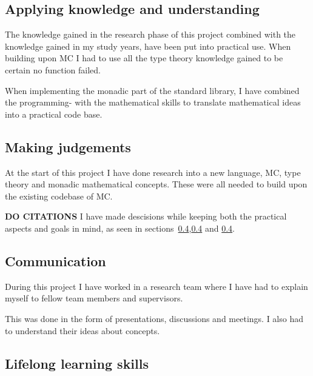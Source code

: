 \subsection{Applying knowledge and understanding}
The knowledge gained in the research phase of this project combined with the knowledge gained in my study years, have been put into practical use.
When building upon MC I had to use all the type theory knowledge gained to be certain no function failed.

When implementing the monadic part of the standard library, I have combined the programming- with the mathematical skills to translate mathematical ideas into a practical code base.


\subsection{Making judgements}
At the start of this project I have done research into a new language, MC, type theory and monadic mathematical concepts.
These were all needed to build upon the existing codebase of MC.

\textbf{DO CITATIONS}
I have made descisions while keeping both the practical aspects and goals in mind, as seen in sections~\ref{},\ref{} and \ref{}.


\subsection{Communication}
During this project I have worked in a research team where I have had to explain myself to fellow team members and supervisors.

This was done in the form of presentations, discussions and meetings.
I also had to understand their ideas about concepts.


\subsection{Lifelong learning skills}


